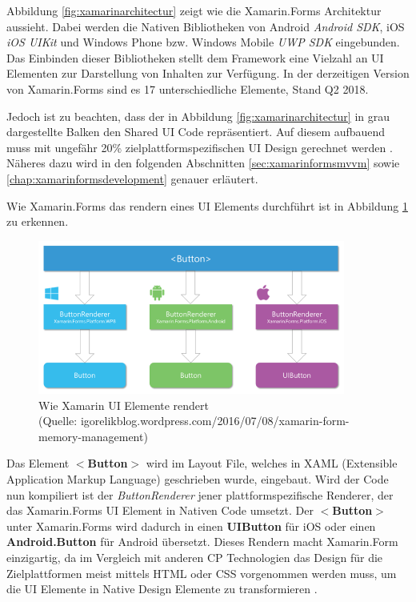 	Abbildung \ref{fig:xamarinarchitectur} zeigt wie die Xamarin.Forms Architektur aussieht. Dabei werden die Nativen Bibliotheken von Android \textit{Android SDK}, iOS \textit{iOS UIKit} und Windows Phone bzw. Windows Mobile \textit{UWP SDK} eingebunden. Das Einbinden dieser Bibliotheken stellt dem Framework eine Vielzahl an UI Elementen zur Darstellung von Inhalten zur Verfügung. In der derzeitigen Version von Xamarin.Forms sind es 17 unterschiedliche Elemente, Stand Q2 2018.

	Jedoch ist zu beachten, dass der in Abbildung \ref{fig:xamarinarchitectur} in grau dargestellte Balken den Shared UI Code repräsentiert. Auf diesem aufbauend muss mit ungefähr 20\% zielplattformspezifischen UI Design gerechnet werden \cite{book:Xamarin-Mobile-Application-Development}. Näheres dazu wird in den folgenden Abschnitten \ref{sec:xamarinformsmvvm} sowie \ref{chap:xamarinformsdevelopment} genauer erläutert.

	Wie Xamarin.Forms das rendern eines UI Elements durchführt ist in Abbildung \ref{fig:xamarinaformsrender} zu erkennen.

	\begin{figure}[h!]
		\centering
		\includegraphics[width=0.9\textwidth]{images/xamarinforms-button-rendering.png}
		\caption[Wie Xamarin UI Elemente rendert]{Wie Xamarin UI Elemente rendert\\\hspace{\textwidth}(Quelle: igorelikblog.wordpress.com/2016/07/08/xamarin-form-memory-management)}
		\label{fig:xamarinaformsrender}
	\end{figure}

	Das Element \textbf{$<$Button$>$} wird im Layout File, welches in XAML (Extensible Application Markup Language) geschrieben wurde, eingebaut. Wird der Code nun kompiliert ist der \textit{ButtonRenderer} jener plattformspezifische Renderer, der das Xamarin.Forms UI Element in Nativen Code umsetzt. Der \textbf{$<$Button$>$} unter Xamarin.Forms wird dadurch in einen \textbf{UIButton} für iOS oder einen \textbf{Android.Button} für Android übersetzt. Dieses Rendern macht Xamarin.Form einzigartig, da im Vergleich mit anderen CP Technologien das Design für die Zielplattformen meist mittels HTML oder CSS vorgenommen werden muss, um die UI Elemente in Native Design Elemente zu transformieren \cite{book:Xamarin-Mobile-Application-Development}.

